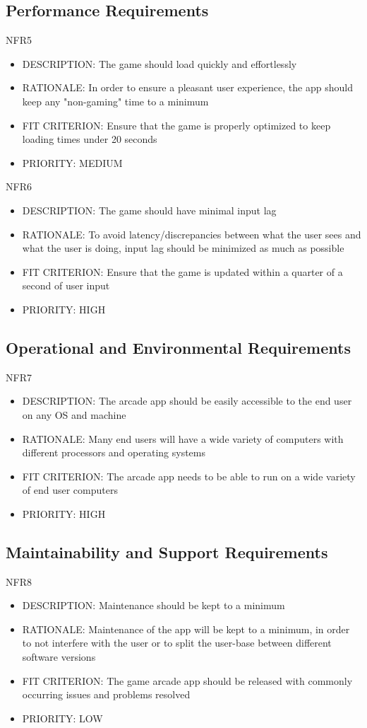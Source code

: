 \documentclass[12pt, titlepage]{article}
\begin{document}
\subsection{Performance Requirements}
NFR5
\begin{itemize}
    \item DESCRIPTION: The game should load quickly and effortlessly
    \item RATIONALE: In order to ensure a pleasant user experience, the app should keep any
"non-gaming" time to a minimum
    \item FIT CRITERION: Ensure that the game is properly optimized to keep loading times under
20 seconds
    \item PRIORITY: MEDIUM
\end{itemize}

NFR6
\begin{itemize}
    \item DESCRIPTION: The game should have minimal input lag
    \item RATIONALE: To avoid latency/discrepancies between what the user sees and what the user is doing,
input lag should be minimized as much as possible
    \item FIT CRITERION: Ensure that the game is updated within a quarter of a second of user input
    \item PRIORITY: HIGH
\end{itemize}

\subsection{Operational and Environmental Requirements}
NFR7
\begin{itemize}
    \item DESCRIPTION: The arcade app should be easily accessible to the end user on any OS and machine
    \item RATIONALE: Many end users will have a wide variety of computers with different processors and operating systems
    \item FIT CRITERION: The arcade app needs to be able to run on a wide variety of end user
computers
    \item PRIORITY: HIGH
\end{itemize}

\subsection{Maintainability and Support Requirements}
NFR8
\begin{itemize}
    \item DESCRIPTION:  Maintenance should be kept to a minimum
    \item RATIONALE: Maintenance of the app will be kept to a minimum, in order to not
interfere with the user or to split the user-base between different software versions
    \item FIT CRITERION: The game arcade app should be released with commonly occurring issues and problems resolved
    \item PRIORITY: LOW
\end{itemize}
\end{document}
